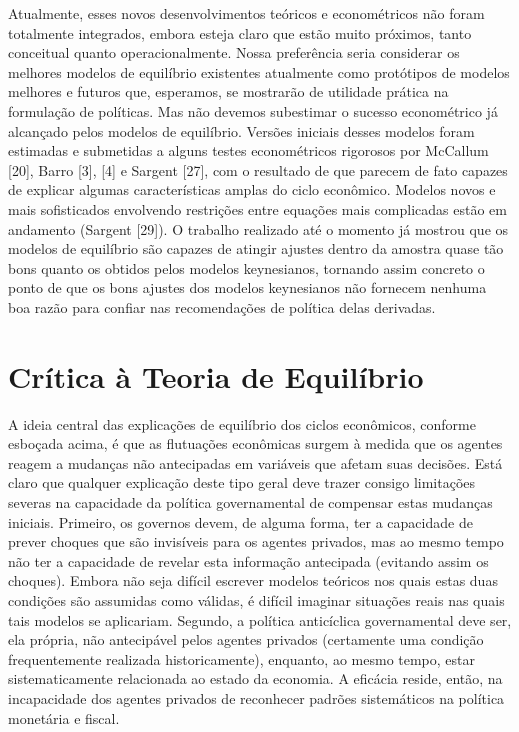 \documentclass[12pt]{article}
\begin{document}
Atualmente, esses novos desenvolvimentos teóricos e econométricos não foram totalmente integrados, embora esteja claro que estão muito próximos, tanto conceitual quanto operacionalmente. Nossa preferência seria considerar os melhores modelos de equilíbrio existentes atualmente como protótipos de modelos melhores e futuros que, esperamos, se mostrarão de utilidade prática na formulação de políticas. Mas não devemos subestimar o sucesso econométrico já alcançado pelos modelos de equilíbrio. Versões iniciais desses modelos foram estimadas e submetidas a alguns testes econométricos rigorosos por McCallum [20], Barro [3], [4] e Sargent [27], com o resultado de que parecem de fato capazes de explicar algumas características amplas do ciclo econômico. Modelos novos e mais sofisticados envolvendo restrições entre equações mais complicadas estão em andamento (Sargent [29]). O trabalho realizado até o momento já mostrou que os modelos de equilíbrio são capazes de atingir ajustes dentro da amostra quase tão bons quanto os obtidos pelos modelos keynesianos, tornando assim concreto o ponto de que os bons ajustes dos modelos keynesianos não fornecem nenhuma boa razão para confiar nas recomendações de política delas derivadas.

\section{Crítica à Teoria de Equilíbrio}

A ideia central das explicações de equilíbrio dos ciclos econômicos, conforme esboçada acima, é que as flutuações econômicas surgem à medida que os agentes reagem a mudanças não antecipadas em variáveis que afetam suas decisões. Está claro que qualquer explicação deste tipo geral deve trazer consigo limitações severas na capacidade da política governamental de compensar estas mudanças iniciais. Primeiro, os governos devem, de alguma forma, ter a capacidade de prever choques que são invisíveis para os agentes privados, mas ao mesmo tempo não ter a capacidade de revelar esta informação antecipada (evitando assim os choques). Embora não seja difícil escrever modelos teóricos nos quais estas duas condições são assumidas como válidas, é difícil imaginar situações reais nas quais tais modelos se aplicariam. Segundo, a política anticíclica governamental deve ser, ela própria, não antecipável pelos agentes privados (certamente uma condição frequentemente realizada historicamente), enquanto, ao mesmo tempo, estar sistematicamente relacionada ao estado da economia. A eficácia reside, então, na incapacidade dos agentes privados de reconhecer padrões sistemáticos na política monetária e fiscal.
\end{document}
